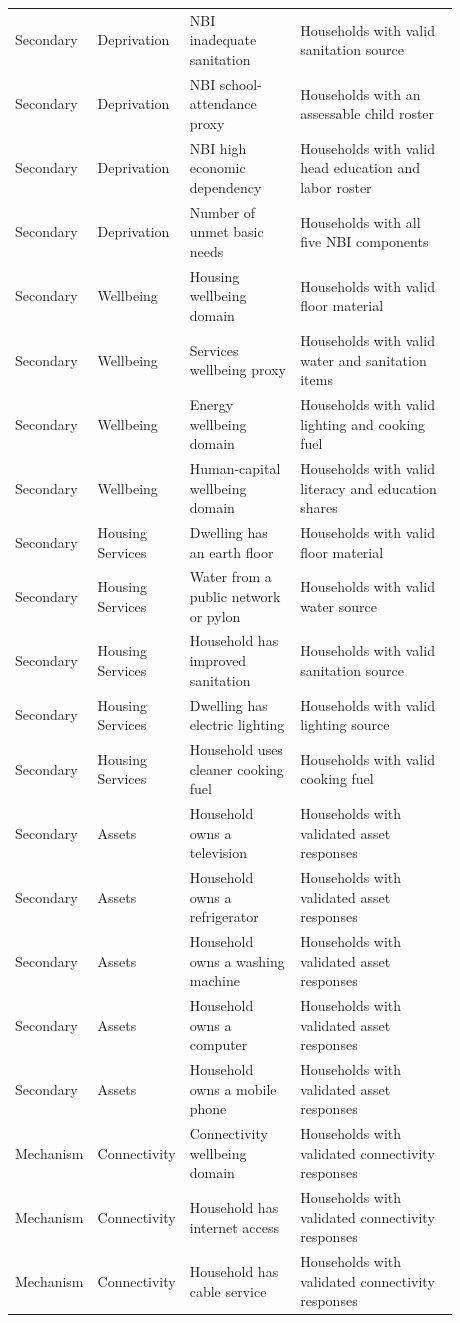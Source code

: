 \begin{longtable}{@{}>{\raggedright\arraybackslash}p{0.10\linewidth}p{0.17\linewidth}p{0.25\linewidth}p{0.36\linewidth}@{}}
Secondary & Deprivation & NBI inadequate sanitation & Households with valid sanitation source \\
Secondary & Deprivation & NBI school-attendance proxy & Households with an assessable child roster \\
Secondary & Deprivation & NBI high economic dependency & Households with valid head education and labor roster \\
Secondary & Deprivation & Number of unmet basic needs & Households with all five NBI components \\
Secondary & Wellbeing & Housing wellbeing domain & Households with valid floor material \\
Secondary & Wellbeing & Services wellbeing proxy & Households with valid water and sanitation items \\
Secondary & Wellbeing & Energy wellbeing domain & Households with valid lighting and cooking fuel \\
Secondary & Wellbeing & Human-capital wellbeing domain & Households with valid literacy and education shares \\
Secondary & Housing Services & Dwelling has an earth floor & Households with valid floor material \\
Secondary & Housing Services & Water from a public network or pylon & Households with valid water source \\
Secondary & Housing Services & Household has improved sanitation & Households with valid sanitation source \\
Secondary & Housing Services & Dwelling has electric lighting & Households with valid lighting source \\
Secondary & Housing Services & Household uses cleaner cooking fuel & Households with valid cooking fuel \\
Secondary & Assets & Household owns a television & Households with validated asset responses \\
Secondary & Assets & Household owns a refrigerator & Households with validated asset responses \\
Secondary & Assets & Household owns a washing machine & Households with validated asset responses \\
Secondary & Assets & Household owns a computer & Households with validated asset responses \\
Secondary & Assets & Household owns a mobile phone & Households with validated asset responses \\
Mechanism & Connectivity & Connectivity wellbeing domain & Households with validated connectivity responses \\
Mechanism & Connectivity & Household has internet access & Households with validated connectivity responses \\
Mechanism & Connectivity & Household has cable service & Households with validated connectivity responses \\
\bottomrule\end{longtable}
